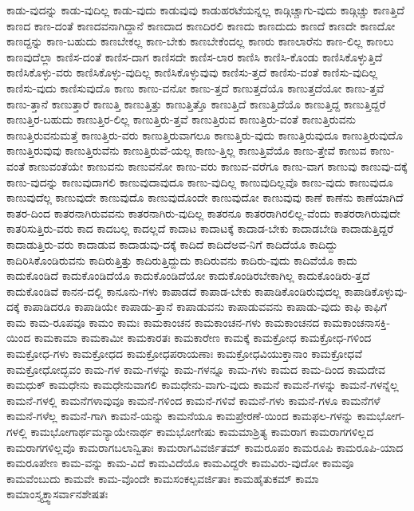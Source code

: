 {ಕಾಡು-ವುದನ್ನು
ಕಾಡು-ವುದಿಲ್ಲ
ಕಾಡು-ವುದು
ಕಾಡುವುವು
ಕಾಡುಹರಟೆಯನ್ನಲ್ಲ
ಕಾಡ್ಗಿಚ್ಚಾಗು-ವುದು
ಕಾಡ್ಗಿಚ್ಚು
ಕಾಣತ್ತಿದೆ
ಕಾಣದ
ಕಾಣ-ದಂತೆ
ಕಾಣದವನಾಗಿದ್ದಾನೆ
ಕಾಣದಾದ
ಕಾಣದಿರಲಿ
ಕಾಣದು
ಕಾಣದುದು
ಕಾಣದೆ
ಕಾಣದೇ
ಕಾಣದೋ
ಕಾಣದ್ದನ್ನು
ಕಾಣ-ಬಹುದು
ಕಾಣಬೇಕಲ್ಲ
ಕಾಣ-ಬೇಕು
ಕಾಣಬೇಕೆಂದಲ್ಲ
ಕಾಣರು
ಕಾಣಲಾರೆನು
ಕಾಣ-ಲಿಲ್ಲ
ಕಾಣಲು
ಕಾಣವುದೆಲ್ಲಾ
ಕಾಣಿಸ-ದಂತೆ
ಕಾಣಿಸ-ದಾಗ
ಕಾಣಿಸದೇ
ಕಾಣಿಸ-ಲಾರ
ಕಾಣಿಸಿ
ಕಾಣಿಸಿ-ಕೊಂಡು
ಕಾಣಿಸಿಕೊಳ್ಳುತ್ತಿದೆ
ಕಾಣಿಸಿಕೊಳ್ಳು-ವರು
ಕಾಣಿಸಿಕೊಳ್ಳು-ವುದಿಲ್ಲ
ಕಾಣಿಸಿಕೊಳ್ಳುವುವು
ಕಾಣಿಸು-ತ್ತದೆ
ಕಾಣಿಸು-ವಂತೆ
ಕಾಣಿಸು-ವುದಿಲ್ಲ
ಕಾಣಿಸು-ವುದು
ಕಾಣಿಸುವುದೊ
ಕಾಣು
ಕಾಣು-ವನೋ
ಕಾಣು-ತ್ತದೆ
ಕಾಣುತ್ತದೆಯೊ
ಕಾಣುತ್ತದೆಯೋ
ಕಾಣು-ತ್ತವೆ
ಕಾಣು-ತ್ತಾನೆ
ಕಾಣುತ್ತಾರೆ
ಕಾಣುತ್ತಿ
ಕಾಣುತ್ತಿತ್ತು
ಕಾಣುತ್ತಿತ್ತೊ
ಕಾಣುತ್ತಿದೆ
ಕಾಣುತ್ತಿದೆಯೊ
ಕಾಣುತ್ತಿದ್ದ
ಕಾಣುತ್ತಿದ್ದರೆ
ಕಾಣುತ್ತಿರ-ಬಹುದು
ಕಾಣುತ್ತಿರ-ಲಿಲ್ಲ
ಕಾಣುತ್ತಿರು-ತ್ತವೆ
ಕಾಣುತ್ತಿರುವ
ಕಾಣುತ್ತಿರು-ವಂತೆ
ಕಾಣುತ್ತಿರುವನು
ಕಾಣುತ್ತಿರುವನುಮತ್ತೆ
ಕಾಣುತ್ತಿರು-ವರು
ಕಾಣುತ್ತಿರುವಾಗಲೂ
ಕಾಣುತ್ತಿರು-ವುದು
ಕಾಣುತ್ತಿರುವುದೂ
ಕಾಣುತ್ತಿರುವುದೊ
ಕಾಣುತ್ತಿರುವುವು
ಕಾಣುತ್ತಿರುವೆನು
ಕಾಣುತ್ತಿರುವೆ-ಯಲ್ಲ
ಕಾಣು-ತ್ತಿಲ್ಲ
ಕಾಣುತ್ತಿವೆಯೊ
ಕಾಣು-ತ್ತೇವೆ
ಕಾಣುವ
ಕಾಣು-ವಂತೆ
ಕಾಣುವಂತೆಯೇ
ಕಾಣುವನು
ಕಾಣುವನೋ
ಕಾಣು-ವರು
ಕಾಣುವ-ವರೆಗೂ
ಕಾಣು-ವಾಗ
ಕಾಣುವು
ಕಾಣುವು-ದಕ್ಕೆ
ಕಾಣು-ವುದನ್ನು
ಕಾಣುವುದಾಗಲಿ
ಕಾಣುವುದಾವುದೂ
ಕಾಣು-ವುದಿಲ್ಲ
ಕಾಣುವುದಿಲ್ಲವೊ
ಕಾಣು-ವುದು
ಕಾಣುವುದೂ
ಕಾಣುವುದೆಲ್ಲ
ಕಾಣುವುದೇ
ಕಾಣುವುದೊ
ಕಾಣುವುದೊಂದೇ
ಕಾಣುವುದೋ
ಕಾಣುವುವು
ಕಾಣೆ
ಕಾಣೆನು
ಕಾಣೆಯಾಗಿದೆ
ಕಾತರ-ದಿಂದ
ಕಾತರನಾಗಿರುವವನು
ಕಾತರನಾಗಿರು-ವುದಿಲ್ಲ
ಕಾತರನೂ
ಕಾತರರಾಗಿರಲಿಲ್ಲ-ವೆಂದು
ಕಾತರರಾಗಿರುವುದೇ
ಕಾತರಿಸುತ್ತಿರು-ವರು
ಕಾದ
ಕಾದಬಲ್ಲ
ಕಾದಲ್ಲದೆ
ಕಾದಾಟ
ಕಾದಾಟಕ್ಕೆ
ಕಾದಾಡ-ಬೇಕು
ಕಾದಾಡಬೇಡಿ
ಕಾದಾಡುತ್ತಿದ್ದರೆ
ಕಾದಾಡುತ್ತಿರು-ವರು
ಕಾದಾಡುವ
ಕಾದಾಡುವು-ದಕ್ಕೆ
ಕಾದಿದೆ
ಕಾದಿದೆಅವ-ನಿಗೆ
ಕಾದಿದೆಯೊ
ಕಾದಿದ್ದು
ಕಾದಿರಿಸಿಕೊಂಡಿರುವನು
ಕಾದಿರುತ್ತಿತ್ತು
ಕಾದಿರುತ್ತಿದ್ದುದು
ಕಾದಿರುವನು
ಕಾದಿರು-ವುದು
ಕಾದಿವೆಯೊ
ಕಾದು
ಕಾದುಕೊಂಡಿದೆ
ಕಾದುಕೊಂಡಿದೆಯೊ
ಕಾದುಕೊಂಡಿದೆಯೋ
ಕಾದುಕೊಂಡಿರಬೇಕಾಗಿಲ್ಲ
ಕಾದುಕೊಂಡಿರು-ತ್ತದೆ
ಕಾದುಕೊಂಡಿವೆ
ಕಾನನ-ದಲ್ಲಿ
ಕಾನೂನು-ಗಳು
ಕಾಪಾಡದೆ
ಕಾಪಾಡ-ಬೇಕು
ಕಾಪಾಡಿಕೊಂಡಿರುವುದಲ್ಲ
ಕಾಪಾಡಿಕೊಳ್ಳುವು-ದಕ್ಕೆ
ಕಾಪಾಡಿದರೂ
ಕಾಪಾಡಿಯೇ
ಕಾಪಾಡು-ತ್ತಾನೆ
ಕಾಪಾಡುವನು
ಕಾಪಾಡುವವನು
ಕಾಪಾಡು-ವುದು
ಕಾಫಿ
ಕಾಫಿಗೆ
ಕಾಮ
ಕಾಮ-ರೂಪವೂ
ಕಾಮಂ
ಕಾಮಃ
ಕಾಮಕಾಂಚನ
ಕಾಮಕಾಂಚನ-ಗಳು
ಕಾಮಕಾಂಚನದ
ಕಾಮಕಾಂಚನಾಸಕ್ತಿ-ಯಿಂದ
ಕಾಮಕಾಮಾ
ಕಾಮಕಾಮೀ
ಕಾಮಕಾರತಃ
ಕಾಮಕಾರೇಣ
ಕಾಮಕ್ಕೆ
ಕಾಮಕ್ರೋಧ
ಕಾಮಕ್ರೋಧ-ಗಳಿಂದ
ಕಾಮಕ್ರೋಧ-ಗಳು
ಕಾಮಕ್ರೋಧದ
ಕಾಮಕ್ರೋಧಪರಾಯಣಾಃ
ಕಾಮಕ್ರೋಧವಿಯುಕ್ತಾನಾಂ
ಕಾಮಕ್ರೋಧವೆ
ಕಾಮಕ್ರೋಧೋದ್ಭವಂ
ಕಾಮ-ಗಳ
ಕಾಮ-ಗಳನ್ನು
ಕಾಮ-ಗಳನ್ನೂ
ಕಾಮ-ಗಳು
ಕಾಮದ
ಕಾಮ-ದಿಂದ
ಕಾಮದೇವ
ಕಾಮಧುಕ್
ಕಾಮಧೇನು
ಕಾಮಧೇನುವಾಗಲಿ
ಕಾಮಧೇನು-ವಾಗು-ವುದು
ಕಾಮನೆ
ಕಾಮನೆ-ಗಳನ್ನು
ಕಾಮನೆ-ಗಳನ್ನೆಲ್ಲ
ಕಾಮನೆ-ಗಳಲ್ಲಿ
ಕಾಮನೆಗಳಾವುವೂ
ಕಾಮನೆ-ಗಳಿಂದ
ಕಾಮನೆ-ಗಳಿವೆ
ಕಾಮನೆ-ಗಳು
ಕಾಮನೆ-ಗಳೂ
ಕಾಮನೆಗಳೆ
ಕಾಮನೆ-ಗಳೆಲ್ಲ
ಕಾಮನೆ-ಗಾಗಿ
ಕಾಮನೆ-ಯನ್ನು
ಕಾಮನೆಯೂ
ಕಾಮಪ್ರೇರಣೆ-ಯಿಂದ
ಕಾಮಫಲ-ಗಳನ್ನು
ಕಾಮಭೋಗ-ಗಳಲ್ಲಿ
ಕಾಮಭೋಗಾರ್ಥಮನ್ಯಾಯೇನಾರ್ಥ
ಕಾಮಭೋಗೇಷು
ಕಾಮಮಾಶ್ರಿತ್ಯ
ಕಾಮರಾಗ
ಕಾಮರಾಗಗಳಿಲ್ಲದ
ಕಾಮರಾಗಗಳಿಲ್ಲವೊ
ಕಾಮರಾಗಬಲಾನ್ವಿತಾಃ
ಕಾಮರಾಗವಿವರ್ಜಿತಮ್
ಕಾಮರೂಪಂ
ಕಾಮರೂಪಿ
ಕಾಮರೂಪಿ-ಯಾದ
ಕಾಮರೂಪೇಣ
ಕಾಮ-ವನ್ನು
ಕಾಮ-ವಿದೆ
ಕಾಮವಿದೆಯೊ
ಕಾಮವಿದ್ದರೇ
ಕಾಮವಿರು-ವುದೋ
ಕಾಮವೂ
ಕಾಮವೆಂಬುದು
ಕಾಮವೇ
ಕಾಮ-ವೊಂದೇ
ಕಾಮಸಂಕಲ್ಪವರ್ಜಿತಾಃ
ಕಾಮಹೈತುಕಮ್
ಕಾಮಾ
ಕಾಮಾಂಸ್ತ್ಯಕ್ತ್ವಾಸರ್ವಾನಶೇಷತಃ
}
